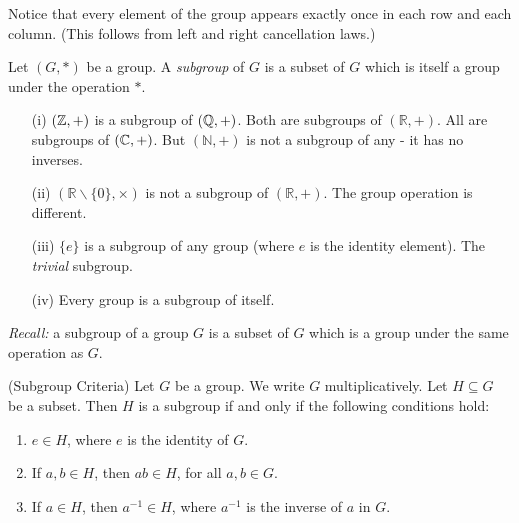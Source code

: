 \begin{example}
Notice that every element of the group appears exactly once in each row and each column. (This follows from left and right cancellation laws.)
\end{example}\vspace*{10pt}




\begin{definition} Let $(G,*)$ be a group. A \emph{subgroup} of $G$ is a subset of $G$ which is itself a group under the operation $*$.	
\end{definition}\vspace*{10pt}


\begin{examples}\begin{enumerate}
 \item[(i)] $(\mathbb{Z},+)$ is a subgroup of $(\mathbb{Q},+)$. Both are subgroups of $(\mathbb{R},+)$. All are subgroups of $(\mathbb{C},+)$. But $(\mathbb{N},+)$
 is not a subgroup of any - it has no inverses.
 \item[(ii)] $(\mathbb{R} \backslash\{0\},\times)$ is not a subgroup of $(\mathbb{R},+)$. The group operation is different.
 \item[(iii)] $\{e\}$ is a subgroup of any group (where $e$ is the identity element). The \emph{trivial} subgroup.
 \item[(iv)] Every group is a subgroup of itself.
  \end{enumerate}
  \end{examples}\vspace*{10pt}

\emph{Recall:}  
a subgroup of a group $G$ is a subset of $G$ which is a group under the same operation as $G$.\\

\begin{proposition} (Subgroup Criteria) Let $G$ be a group. We write $G$ multiplicatively. Let $H \subseteq G$ be a subset. Then $H$ is a subgroup if and only if the following conditions hold:\begin{enumerate}
\item $e \in H$, where $e$ is the identity of $G$.
\item If $a,b \in H$, then $ab \in H$, for all $a,b \in G$.
\item If $a \in H$, then $a^{-1} \in H$, where $a^{-1}$ is the inverse of $a$ in $G$.	
\end{enumerate}
\end{proposition}

